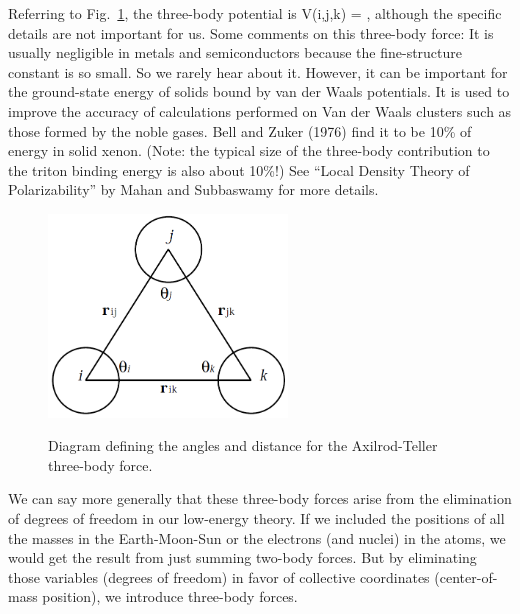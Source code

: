 Referring to Fig.~\ref{fig:Axilrod_Teller}, the three-body potential is
    \beq
       V(i,j,k) =  \;,
    \eeq
although the specific details are not important for us.
Some comments on this three-body force:
 \bi
   \I It is usually negligible in metals and semiconductors because the
   fine-structure constant is so small.  So we rarely hear about it.
   \I However, it can be important for the ground-state energy of solids bound by
       van der Waals potentials. 
   \I It is used to improve the accuracy of calculations performed on Van der
    Waals clusters such as those formed by the noble gases. 
   \I Bell and Zuker (1976) find it to be 10\% of energy in solid xenon. 
   (Note: the typical size of the three-body contribution to the triton
   binding energy is also about 10\%!)    
 \I See ``Local Density Theory of Polarizability'' by Mahan and Subbaswamy
 for more details.
       
 \ei


  \begin{figure}[tbh]
  \begin{center}
    \includegraphics[width=2.5in]{figures/axilrod-teller_term.png}~~~%
    \caption{Diagram defining the angles and distance for the Axilrod-Teller
    three-body force.}
    \label{fig:Axilrod_Teller}
  \end{center}
  \end{figure}

  We can say more generally that these three-body forces arise from the
  elimination of degrees of freedom in our low-energy theory.  If we
  included the positions of all the masses in the Earth-Moon-Sun or the
  electrons (and nuclei) in the atoms, we would get the result from just
  summing two-body forces.  But by eliminating those variables
  (degrees of freedom) in favor
  of collective coordinates (center-of-mass position), we introduce three-body
  forces.  

